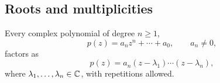 

\subsection{Roots and multiplicities}

\begin{theorem}
  \label{thm:linear-algebra-i:fundamental-theorem-of-algebra}
  Every complex polynomial of degree \(n\ge1\),
  \[
    p(z)=a_nz^n+\cdots+a_0,\qquad a_n\ne0,
  \]
  factors as
  \[
    p(z)=a_n(z-\lambda_1)\cdots(z-\lambda_n),
  \]
  where \(\lambda_1,\ldots,\lambda_n\in\mathbb{C}\), with repetitions allowed.
\end{theorem}
